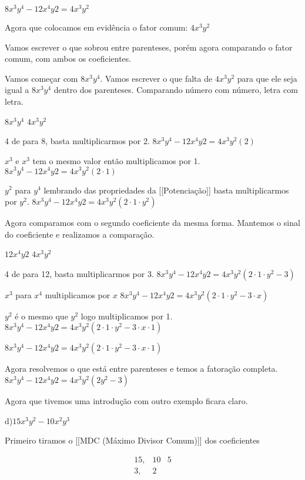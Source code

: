 \documentclass[letterpaper]{book}
\begin{document}
\(8 x^{3} y^{4} - 12 x^{4} y{2} = 4x^{3}y^{2}\)

Agora que colocamos em evidência o fator comum: \(4x^{3}y^{2}\) 

Vamos escrever o que sobrou entre parenteses, porém agora comparando o fator comum, com ambos os coeficientes.

Vamos começar com \(8 x^{3} y^{4}\). Vamos escrever o que falta de $4x^{3}y^{2}$ para que ele seja igual a $8 x^{3} y^{4}$ dentro dos parenteses. Comparando número com número, letra com letra.
 
\(8x^{3} y^{4}\)
\(4x^{3}y^{2}\)

4 de para 8, basta multiplicarmos por 2.
\(8 x^{3} y^{4} - 12 x^{4} y{2} = 4x^{3}y^{2}(2)\)

\(x^{3}\)  e $x^{3}$ tem o mesmo valor então multiplicamos por 1.
\(8 x^{3} y^{4} - 12 x^{4} y{2} = 4x^{3}y^{2}(2 \cdot  1)\)

\(y^{2}\) para $y^{4}$ lembrando das propriedades da [[Potenciação]] basta multiplicarmos por $y^{2}$.
\(8 x^{3} y^{4} - 12 x^{4} y{2} = 4x^{3}y^{2}(2 \cdot  1 \cdot y^{2})\)

Agora comparamos com o segundo coeficiente da mesma forma. Mantemos o sinal do coeficiente e realizamos a comparação.

\(12 x^{4} y{2}\)
\(4x^{3}y^{2}\)

4 de para 12, basta multiplicarmos por 3.
\(8 x^{3} y^{4} - 12 x^{4} y{2} = 4x^{3}y^{2}(2 \cdot  1 \cdot y^{2} - 3)\)

\(x^{3}\) para $x^{4}$ multiplicamos por $x$
\(8 x^{3} y^{4} - 12 x^{4} y{2} = 4x^{3}y^{2}(2 \cdot  1 \cdot y^{2} - 3 \cdot x)\)

\(y^{2}\) é o mesmo que $y^{2}$ logo multiplicamos por 1.
\(8 x^{3} y^{4} - 12 x^{4} y{2} = 4x^{3}y^{2}(2 \cdot  1 \cdot y^{2} - 3 \cdot x \cdot 1)\)

\(8 x^{3} y^{4} - 12 x^{4} y{2} = 4x^{3}y^{2}(2 \cdot  1 \cdot y^{2} - 3 \cdot x \cdot 1)\)

Agora resolvemos o que está entre parenteses e temos a fatoração completa.
\(8 x^{3} y^{4} - 12 x^{4} y{2} = 4x^{3}y^{2}(2y^{2} - 3)\)

Agora que tivemos uma introdução com outro exemplo ficara claro.

d)\(15x^{3}y^{2} - 10x^{2}y^{3}\)

Primeiro tiramos o [[MDC (Máximo Divisor Comum)]] dos coeficientes

\[
\begin{array}{cc|cc}
15, & 10 & 5 \\
3, & 2 
\end{array}
\]
\end{document}
